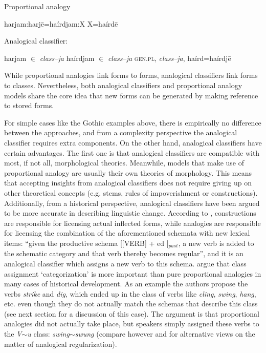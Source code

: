 \begin{exe}
    \ex \label{exe-proportional-schema} Proportional analogy
    \begin{xlist}
        \ex harjam:harjē=haírdjam:X
        \ex X=haírdē
    \end{xlist}

    \ex \label{exe-classifier-schema} Analogical classifier:
    \begin{xlist}
        \ex harjam $\in$ \textit{class--ja}
        \ex haírdjam $\in$ \textit{class--ja}
        \ex \textsc{gen.pl}, \textit{class--ja}, haírd=haírdjē
    \end{xlist}
\end{exe}


While proportional analogies link forms to forms, analogical classifiers link forms to classes. Nevertheless, both analogical classifiers and proportional analogy models share the core idea that new forms can be generated by making reference to stored forms.

For simple cases like the Gothic examples above, there is empirically no difference between the approaches, and from a complexity perspective the analogical classifier requires extra components. On the other hand, analogical classifiers have certain advantages. The first one is that analogical classifiers are compatible with most, if not all, morphological theories. Meanwhile, models that make use of proportional analogy are usually their own theories of morphology. This means that accepting insights from analogical classifiers does not require giving up on other theoretical concepts (e.g. stems, rules of impoverishment or constructions). Additionally, from a historical perspective, analogical classifiers have been argued to be more accurate in describing linguistic change. According to \textcite[506]{Bybee.2015}, constructions are responsible for licensing actual inflected forms, while analogies are responsible for licensing the combination of the aforementioned schemata with new lexical items: ``given the productive schema [[VERB] + ed ]$_{past}$, a new verb is added to the schematic category and that verb thereby becomes regular'', and it is an analogical classifier which assigns a new verb to this schema. \textcite{Bybee.2015} argue that class assignment `categorization' is more important than pure proportional analogies in many cases of historical development. As an example the authors propose the verbs \textit{strike} and \textit{dig}, which ended up in the class of verbs like \textit{cling}, \textit{swing}, \textit{hang}, etc. even though they do not actually match the schemas that describe this class (see next section for a discussion of this case). The argument is that proportional analogies did not actually take place, but speakers simply assigned these verbs to the \textit{V$\sim$u} class: \textit{swing}$\sim$\textit{swung} (compare however \textcite{DeSmet.2016} and \textcite{Fertig.2013} for alternative views on the matter of analogical regularization).

